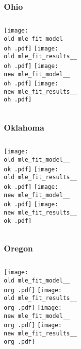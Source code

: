 \documentclass{beamer}
\newcommand{\old}{current_two_stage_output/pyseir/state_summaries/reports/}
\newcommand{\new}{new_shortest_t_delta/pyseir/state_summaries/reports/}
\newcommand{\oh}{Ohio__39}
\newcommand{\ok}{Oklahoma__40}
\newcommand{\org}{Oregon__41}
\begin{document}
\begin{frame}
\frametitle{Ohio}
    \begin{columns}[t]

       \texttt{[image: \\old mle\_fit\_model\_\_\\oh .pdf]}
       \texttt{[image: \\old mle\_fit\_results\_\_\\oh .pdf]}   
       \texttt{[image: \\new mle\_fit\_model\_\_\\oh .pdf]}
       \texttt{[image: \\new mle\_fit\_results\_\_\\oh .pdf]}   
\end{columns}
\end{frame}

\begin{frame}
\frametitle{Oklahoma}
    \begin{columns}[t]

       \texttt{[image: \\old mle\_fit\_model\_\_\\ok .pdf]}
       \texttt{[image: \\old mle\_fit\_results\_\_\\ok .pdf]}   
       \texttt{[image: \\new mle\_fit\_model\_\_\\ok .pdf]}
       \texttt{[image: \\new mle\_fit\_results\_\_\\ok .pdf]}   
\end{columns}
\end{frame}


\begin{frame}
\frametitle{Oregon}
    \begin{columns}[t]

       \texttt{[image: \\old mle\_fit\_model\_\_\\org .pdf]}
       \texttt{[image: \\old mle\_fit\_results\_\_\\org .pdf]}   
       \texttt{[image: \\new mle\_fit\_model\_\_\\org .pdf]}
       \texttt{[image: \\new mle\_fit\_results\_\_\\org .pdf]}   
\end{columns}
\end{frame}
\end{document}
